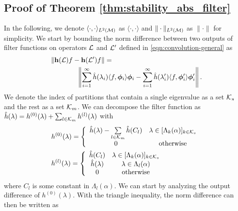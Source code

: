 \subsection{Proof of Theorem \ref{thm:stability_abs_filter}}
\label{app:stability_abs_filter}
In the following, we denote $\langle\cdot,\cdot \rangle_{L^2({\mathcal M})}$ as $\langle\cdot,\cdot \rangle$ and $\|\cdot\|_{L^2({\mathcal M})}$ as $\|\cdot\|$ for simplicity. We start by bounding the norm difference between two outputs of filter functions on operators ${\mathcal L}$ and ${\mathcal L}'$ defined in \eqref{eqn:convolution-general} as
\begin{align}
 \nonumber  &\left\| {\mathbf h}({\mathcal L}) f - {\mathbf h}({\mathcal L}')f\right\| 
  = \\
  &\qquad \qquad\left\| \sum_{i=1}^\infty \hat{h}(\lambda_{i}) \langle f, \bm\phi_i \rangle \bm\phi_i - \sum_{i=1}^\infty \hat{h}(\lambda'_{i}) \langle f, \bm\phi'_i \rangle \bm\phi'_i \right\|. \label{eqn:diff}
\end{align}
We denote the index of partitions that contain a single eigenvalue as a set ${\mathcal K}_s$ and the rest as a set ${\mathcal K}_m$. We can decompose the filter function as $\hat{h}(\lambda)=h^{(0)}(\lambda)+\sum_{l\in{\ensuremath{\mathcal K}}_m}h^{(l)}(\lambda)$ with
\begin{align}
\label{eqn:h0}& h^{(0)}(\lambda) = \left\{ 
\begin{array}{cc} 
              \hat{h}(\lambda)-\sum\limits_{l\in{\ensuremath{\mathcal K}}_m}\hat{h}(C_l)  &  \lambda\in[\Lambda_k(\alpha)]_{k\in{\ensuremath{\mathcal K}}_s} \\
                0& \text{otherwise}  \\
                \end{array} \right. \\
\label{eqn:hl}& h^{(l)}(\lambda) = \left\{ 
\begin{array}{cc} 
                \hat{h}(C_l) &  \lambda\in[\Lambda_k(\alpha)]_{k\in{\ensuremath{\mathcal K}}_s} \\
                \hat{h}(\lambda) & 
                \lambda\in\Lambda_l(\alpha)\\
                0 &
                \text{otherwise}  \\
                \end{array} \right.             
\end{align}
where $C_l$ is some constant in $\Lambda_l(\alpha)$. We can start by analyzing the output difference of $h^{(0)}(\lambda)$. With the triangle inequality, the norm difference can then be written as
